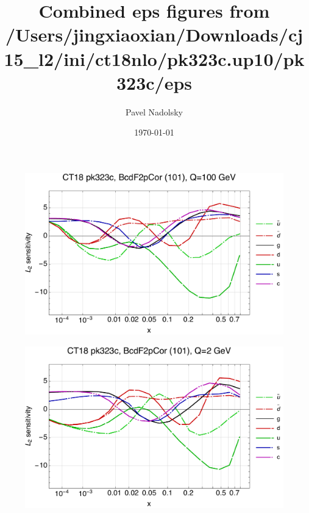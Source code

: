 \documentclass[10pt,aps,prd,floatfix,titlepage]{revtex4}
\begin{document}
\title{Combined eps figures from /Users/jingxiaoxian/Downloads/cj15\_l2/ini/ct18nlo/pk323c.up10/pk323c/eps}
\date{\today}
\author{Pavel Nadolsky}
\maketitle
\begin{figure}
\includegraphics[width=\textwidth,height=0.44\textheight,keepaspectratio]{1/101_ct18nn_L2_q100_Sf_1.pdf}
\caption{}
\end{figure}
\begin{figure}
\includegraphics[width=\textwidth,height=0.44\textheight,keepaspectratio]{1/101_ct18nn_L2_q2_Sf_1.pdf}
\caption{}
\end{figure}
\clearpage
\end{document}
